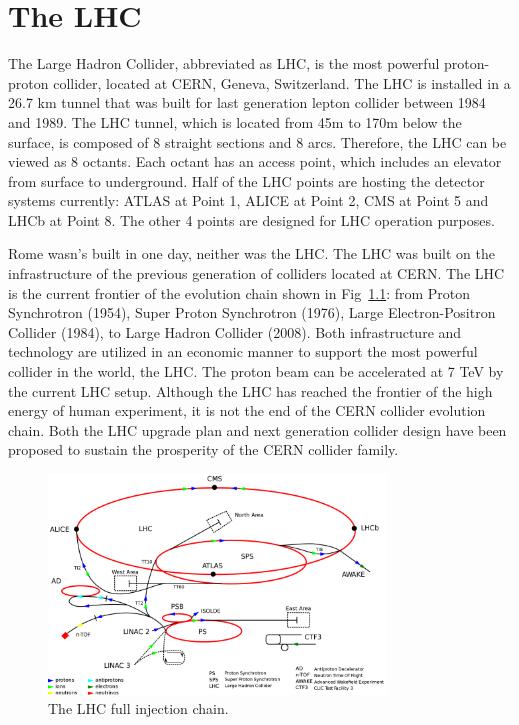 \chapter{The LHC}
\label{ch:lhc}
\par The Large Hadron Collider, abbreviated as LHC, is the most powerful proton-proton collider, located at CERN, Geneva, Switzerland. The LHC is installed in a 26.7 km tunnel that was built for last generation lepton collider between 1984 and 1989. The LHC tunnel, which is located from 45m to 170m below the surface, is composed of 8 straight sections and 8 arcs. Therefore, the LHC can be viewed as 8 octants. Each octant has an access point, which includes an elevator from surface to underground. Half of the LHC points are hosting the detector systems currently: ATLAS\cite{Aad:2008zzm} at Point 1, ALICE\cite{Aamodt:2008zz} at Point 2, CMS\cite{Chatrchyan:2008aa} at Point 5 and LHCb\cite{Alves:2008zz} at Point 8. The other 4 points are designed for LHC operation purposes.

\par Rome wasn's built in one day, neither was the LHC. The LHC was built on the infrastructure of the previous generation of colliders located at CERN. The LHC is the current frontier of the evolution chain shown in Fig~\ref{fig:c3cernaccs}: from Proton Synchrotron (1954)\cite{Gilardoni:2011za}, Super Proton Synchrotron (1976)\cite{Doble:2017syb}, Large Electron-Positron Collider (1984)\cite{LepInjectorStudy:1983aa}\cite{LepInjectorStudy:1983ab}, to Large Hadron Collider (2008)\cite{Bruning:2004ej}\cite{Buning:2004wk}. Both infrastructure and technology are utilized in an economic manner to support the most powerful collider in the world, the LHC. The proton beam can be accelerated at 7 TeV by the current LHC setup. Although the LHC has reached the frontier of the high energy of human experiment, it is not the end of the CERN collider evolution chain. Both the LHC upgrade plan\cite{ApollinariG.:2017ojx} and next generation collider design\cite{Benedikt:2018csr} have been proposed to sustain the prosperity of the CERN collider family.

\begin{figure}[htbp]
 \begin{center}
  \includegraphics[width=0.8\textwidth]{chapters/c3/figures/cern-accelerator-complex.png}
 \end{center}
 \caption{The LHC full injection chain.}
 \label{fig:c3cernaccs}
\end{figure}

